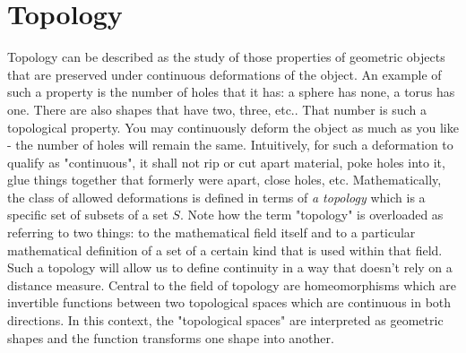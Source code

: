 \chapter{Topology}
Topology can be described as the study of those properties of geometric objects that are preserved under continuous deformations of the object. An example of such a property is the number of holes that it has: a sphere has none, a torus has one. There are also shapes that have two, three, etc.. That number is such a topological property. You may continuously deform the object as much as you like - the number of holes will remain the same. Intuitively, for such a deformation to qualify as "continuous", it shall not rip or cut apart material, poke holes into it, glue things together that formerly were apart, close holes, etc. Mathematically, the class of allowed deformations is defined in terms of \emph{a topology} which is a specific set of subsets of a set $S$. Note how the term "topology" is overloaded as referring to two things: to the mathematical field itself and to a particular mathematical definition of a set of a certain kind that is used within that field. Such a topology will allow us to define continuity in a way that doesn't rely on a distance measure. Central to the field of topology are homeomorphisms which are invertible functions between two topological spaces which are continuous in both directions. In this context, the "topological spaces" are interpreted as geometric shapes and the function transforms one shape into another.






